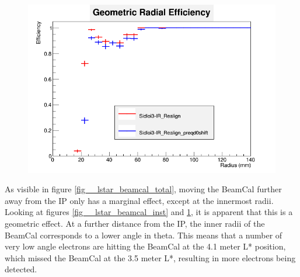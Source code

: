 \documentclass{report}
\begin{document}
                \begin{figure}[H]
                    \includegraphics[width=\textwidth]{RadialEfficiencyFP_geometric}
                    \centering
                    \caption{}
                    \label{fig__lstar_beamcal_geom}
                \end{figure}

                As visible in figure \ref{fig__lstar_beamcal_total}, moving the BeamCal further away from the IP only has a marginal effect, except at the innermost radii. Looking at figures \ref{fig__lstar_beamcal_inst} and \ref{fig__lstar_beamcal_geom}, it is apparent that this is a geometric effect. At a further distance from the IP, the inner radii of the BeamCal corresponds to a lower angle in theta. This means that a number of very low angle electrons are hitting the BeamCal at the 4.1 meter L* position, which missed the BeamCal at the 3.5 meter L*, resulting in more electrons being detected.
                    
\end{document}
